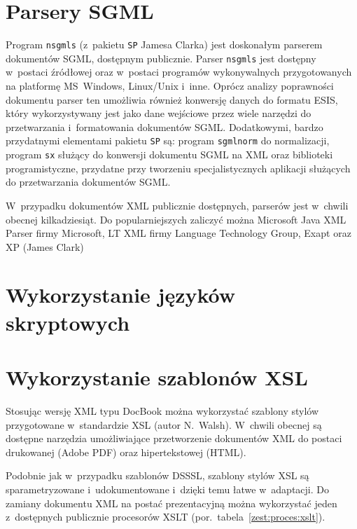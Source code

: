 \documentclass[brudnopis]{xmgr}
\begin{document}
\section{Parsery SGML}
Program \texttt{nsgmls} (z~pakietu \texttt{SP} Jamesa Clarka) jest
doskonałym parserem dokumentów SGML, dostępnym
publicznie.  Parser \texttt{nsgmls} jest dostępny w~postaci źródłowej
oraz w~postaci programów wykonywalnych przygotowanych na platformę
MS~Windows, Linux/Unix i~inne. Oprócz analizy poprawności dokumentu
parser ten umożliwia również konwersję danych do formatu
ESIS, który wykorzystywany jest jako dane wejściowe przez
wiele narzędzi do przetwarzania i~formatowania dokumentów SGML.
Dodatkowymi, bardzo przydatnymi elementami pakietu \texttt{SP} są:
program \texttt{sgmlnorm} do normalizacji, program \texttt{sx} służący
do konwersji dokumentu SGML na XML oraz biblioteki programistyczne,
przydatne przy tworzeniu specjalistycznych aplikacji służących do
przetwarzania dokumentów SGML.
      
W~przypadku dokumentów XML publicznie dostępnych, parserów jest
w~chwili obecnej kilkadziesiąt. Do popularniejszych zaliczyć można
Microsoft Java XML Parser firmy Microsoft, LT XML firmy Language
Technology Group, Exapt oraz XP (James Clark)
      
\section{Wykorzystanie języków skryptowych}
      
\section{Wykorzystanie szablonów XSL}

Stosując wersję XML typu DocBook można wykorzystać szablony stylów
przygotowane w~standardzie XSL (autor N.~Walsh). W~chwili obecnej
są dostępne narzędzia umożliwiające przetworzenie dokumentów XML do
postaci drukowanej (Adobe PDF) oraz hipertekstowej (HTML).

Podobnie jak w~przypadku szablonów DSSSL, szablony stylów XSL są
sparametryzowane i~udokumentowane i~dzięki temu łatwe w~adaptacji. Do
zamiany dokumentu XML na postać prezentacyjną można wykorzystać jeden
z~dostępnych publicznie procesorów XSLT
(por.~tabela~\ref{zest:proces:xslt}).
\end{document}
